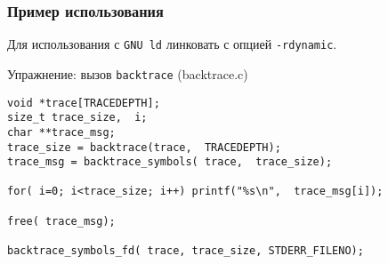 \begin{frame}[fragile]
	\frametitle{Пример использования}

	Для использования с {\tt GNU ld} линковать с опцией {\tt -rdynamic}.

	\begin{block}{Упражнение: вызов {\tt backtrace} (backtrace.c)}

	\begin{lstlisting}
void *trace[TRACEDEPTH];
size_t trace_size,  i;
char **trace_msg;
trace_size = backtrace(trace,  TRACEDEPTH);
trace_msg = backtrace_symbols( trace,  trace_size);

for( i=0; i<trace_size; i++) printf("%s\n",  trace_msg[i]);

free( trace_msg);

backtrace_symbols_fd( trace, trace_size, STDERR_FILENO);
	\end{lstlisting}

	\end{block}
\end{frame}


